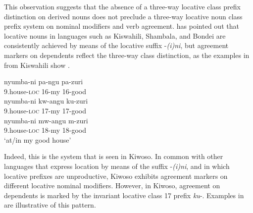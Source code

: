 \documentclass[output=paper]{langscibook}
\begin{document}
This observation suggests that the absence of a three-way locative class prefix distinction on derived nouns does not preclude a three-way locative noun class prefix system on nominal modifiers and verb agreement. \citet{Grégoire1975} has pointed out that locative nouns in languages such as Kiswahili, Shambala, and Bondei are consistently achieved by means of the locative suffix -\textit{(i)ni}, but agreement markers on dependents reflect the three-way class distinction, as the examples in  from Kiswahili show \citep[402]{Carstens1997}.

\ea%
    \label{ex:mallya:9}
    \ea\label{ex:mallya:9a}
    \gll nyumba-ni          pa-ngu   pa-zuri\\
            9.house-\textsc{loc}    16-my        16-good\\
            
    \ex\label{ex:mallya:9b}
    \gll nyumba-ni        kw-angu    ku-zuri\\
              9.house-\textsc{loc}    17-my        17-good\\
     \ex\label{ex:mallya:9c}
     \gll nyumba-ni       mw-angu    m-zuri\\
              9.house-\textsc{loc}    18-my        18-good\\
     \glt  ‘at/in my good house’
    \z
\z

Indeed, this is the system that is seen in Kiwoso. In common with other languages that express location by means of the suffix -\textit{(i)ni}, and in which locative prefixes are unproductive, Kiwoso exhibits agreement markers on different locative nominal modifiers. However, in Kiwoso, agreement on dependents is marked by the invariant locative class 17 prefix \textit{ku}{}-. Examples in  are illustrative of this pattern.

\ea\label{ex:mallya:10}      


\end{document}
